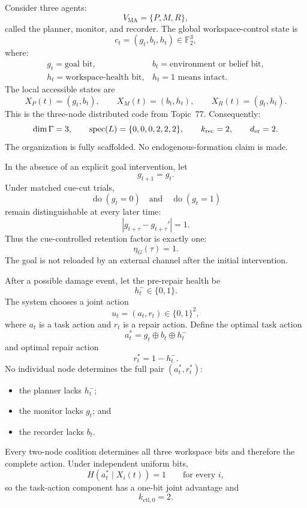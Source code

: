 Consider three agents:
\[
V_{\mathrm{MA}}=\{P,M,R\},
\]
called the planner, monitor, and recorder. The global workspace-control state
is
\[
c_t=(g_t,b_t,h_t)\in\mathbb F_2^3,
\]
where:
\[
\begin{array}{ll}
g_t=\text{goal bit},
&b_t=\text{environment or belief bit},\\
h_t=\text{workspace-health bit},
&h_t=1\text{ means intact}.
\end{array}
\]
The local accessible states are
\[
X_P(t)=(g_t,b_t),
\qquad
X_M(t)=(b_t,h_t),
\qquad
X_R(t)=(g_t,h_t).
\]
This is the three-node distributed code from Topic~77. Consequently:
\[
\dim\Gamma=3,
\qquad
\operatorname{spec}(L)=\{0,0,0,2,2,2\},
\qquad
k_{\mathrm{rec}}=2,
\qquad
d_{\mathrm{er}}=2.
\]
The organization is fully scaffolded. No endogenous-formation claim is made.


In the absence of an explicit goal intervention, let
\[
g_{t+1}=g_t.
\]
Under matched cue-cut trials,
\[
\operatorname{do}(g_t=0)
\quad\text{and}\quad
\operatorname{do}(g_t=1)
\]
remain distinguishable at every later time:
\[
|g_{t+\tau}-g_{t+\tau}'|=1.
\]
Thus the cue-controlled retention factor is exactly one:
\[
\eta_G(\tau)=1.
\]
The goal is not reloaded by an external channel after the initial intervention.


After a possible damage event, let the pre-repair health be
\[
h_t^-\in\{0,1\}.
\]
The system chooses a joint action
\[
u_t=(a_t,r_t)\in\{0,1\}^2,
\]
where \(a_t\) is a task action and \(r_t\) is a repair action. Define the
optimal task action
\[
a_t^*=g_t\oplus b_t\oplus h_t^-
\]
and optimal repair action
\[
r_t^*=1-h_t^-.
\]
No individual node determines the full pair \((a_t^*,r_t^*)\):
\begin{itemize}
\item the planner lacks \(h_t^-\);
\item the monitor lacks \(g_t\); and
\item the recorder lacks \(b_t\).
\end{itemize}
Every two-node coalition determines all three workspace bits and therefore the
complete action. Under independent uniform bits,
\[
H(a_t^*\mid X_i(t))=1
\qquad\text{for every }i,
\]
so the task-action component has a one-bit joint advantage and
\[
k_{\mathrm{ctl},0}=2.
\]


